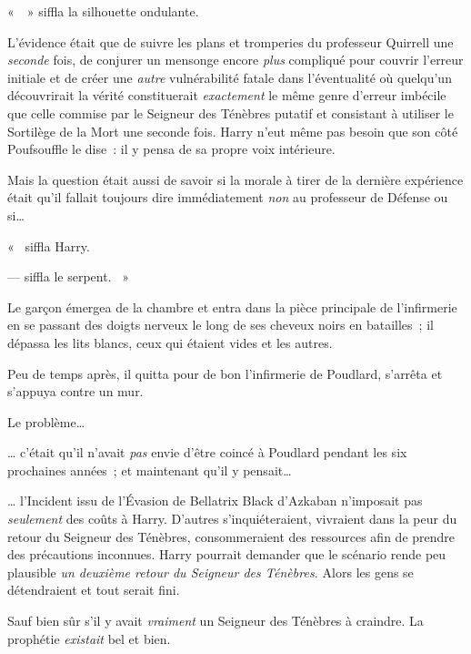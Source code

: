 «~~» siffla la silhouette ondulante.

L'évidence était que de suivre les plans et tromperies du professeur Quirrell une \emph{seconde} fois, de conjurer un mensonge encore \emph{plus} compliqué pour couvrir l'erreur initiale et de créer une \emph{autre} vulnérabilité fatale dans l'éventualité où quelqu'un découvrirait la vérité constituerait \emph{exactement} le même genre d'erreur imbécile que celle commise par le Seigneur des Ténèbres putatif et consistant à utiliser le Sortilège de la Mort une seconde fois. Harry n'eut même pas besoin que son côté Poufsouffle le dise~: il y pensa de sa propre voix intérieure.

Mais la question était aussi de savoir si la morale à tirer de la dernière expérience était qu'il fallait toujours dire immédiatement \emph{non} au professeur de Défense ou si…

«~ siffla Harry. 

---  siffla le serpent. ~»

\later

Le garçon émergea de la chambre et entra dans la pièce principale de l'infirmerie en se passant des doigts nerveux le long de ses cheveux noirs en batailles~; il dépassa les lits blancs, ceux qui étaient vides et les autres.

Peu de temps après, il quitta pour de bon l'infirmerie de Poudlard, s'arrêta et s'appuya contre un mur.

Le problème…

… c'était qu'il n'avait \emph{pas} envie d'être coincé à Poudlard pendant les six prochaines années~; et maintenant qu'il y pensait…

… l'Incident issu de l'Évasion de Bellatrix Black d'Azkaban n'imposait pas \emph{seulement} des coûts à Harry. D'autres s'inquiéteraient, vivraient dans la peur du retour du Seigneur des Ténèbres, consommeraient des ressources afin de prendre des précautions inconnues. Harry pourrait demander que le scénario rende peu plausible \emph{un deuxième retour du Seigneur des Ténèbres.} Alors les gens se détendraient et tout serait fini.

Sauf bien sûr s'il y avait \emph{vraiment} un Seigneur des Ténèbres à craindre. La prophétie \emph{existait} bel et bien.

